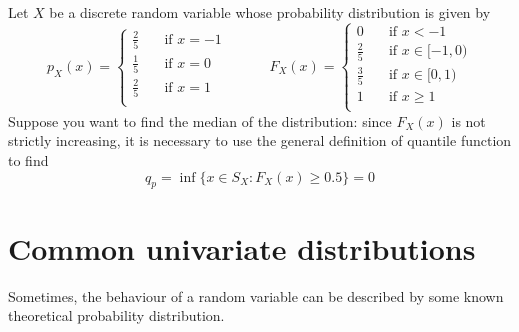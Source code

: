 \documentclass{report}
\begin{document}
\begin{examplebox}
    Let $\displaystyle X$ be a discrete random variable whose probability distribution is given by
    \[p_X(x) = \begin{cases}
        \frac{2}{5} &\quad\text{if $x = -1$} \\
        \frac{1}{5} &\quad\text{if $x = 0$} \\
        \frac{2}{5} &\quad\text{if $x = 1$} \\
    \end{cases} \quad\quad\quad F_X(x) = \begin{cases}
        0 &\quad\text{if $x < -1$} \\
        \frac{2}{5} &\quad\text{if $x \in [-1, 0)$} \\
        \frac{3}{5} &\quad\text{if $x \in [0, 1)$} \\
        1 &\quad\text{if $x \ge 1$} \\
    \end{cases}\]
    Suppose you want to find the median of the distribution: since $\displaystyle F_X(x)$ is not strictly increasing, it is necessary to use the general definition of quantile function to find
    \[q_p = \inf\{x \in S_X : F_X(x) \ge 0.5\} = 0\]
\end{examplebox}
\section{Common univariate distributions}
Sometimes, the behaviour of a random variable can be described by some known theoretical probability distribution.
\end{document}
